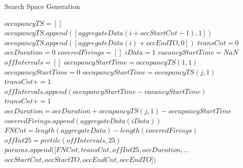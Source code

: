 \begin{algorithm}                      %
\caption{Search Space Generation}          %
\label{alg:paramGen}                           %
\begin{algorithmic}                    %
\STATE $occupancyTS = []$
\STATE $occupancyTS.append([aggregateData(i+occStartCnt-1), 1])$
\STATE $occupancyTS.append([aggregateData(i) +
  occEndTO, 0])$
\ENDIF
\ENDFOR
\STATE $transCnt = 0$
\STATE $occDuration = 0$
\STATE $coveredFirings = []$
\STATE $iData = 1$
\STATE $vacancyStartTime = NaN$
\STATE $offIntervals = []$
\STATE $occupancyStartTime = occupancyTS(1, 1)$
\ELSE
\STATE $occupancyStartTime = 0$
\ENDIF
{}
\STATE $occupancyStartTime = occupancyTS(j, 1)$
\STATE $transCnt += 1$
\STATE $offIntervals.append(occupancyStartTime - vacancyStartTime)$
\ENDIF
{}
\STATE $transCnt += 1$
\STATE $occDuration = occDuration +
occupancyTS(j, 1) - occupancyStartTime$
\STATE
$coveredFirings.append(aggregateData(iData))$
\ENDIF
\ENDWHILE
\ENDIF
\STATE $FNCnt = length(aggregateData) - length(coveredFirings)$
\STATE $offInt25 = prctile(offIntervals, 25)$
\STATE $params.append([FNCnt, transCnt, offInt25, occDuration, ...$
\STATE $occStartCnt, occStartTO, occEndCnt, occEndTO])$
\ENDFOR
\ENDFOR
\ENDFOR
\ENDFOR
\ENDFOR
\end{algorithmic}
\end{algorithm}

